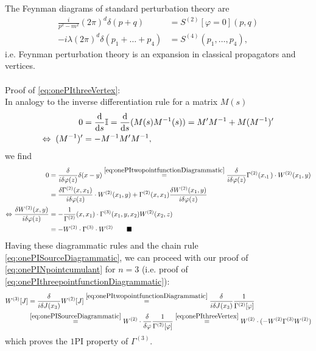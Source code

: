 The Feynman diagrams of standard perturbation theory are
\begin{align}
	\frac{i}{p^2-m^2} (2\pi)^d \delta(p+q) &= S^{(2)}[\varphi=0](p,q) \\
	-i \lambda (2\pi)^d \delta(p_1+\dots+p_4) &=S^{(4)}(p_1,\dots,p_4),
\end{align}
i.e. Feynman perturbation theory is an expansion in classical propagators and vertices.\\
\\
Proof of \ref{eq:onePIthreeVertex}:\\
In analogy to the inverse differentiation rule for a matrix $M(s)$
\begin{align*}
	0&= \frac{\mathrm{d}}{\mathrm{d} s}\mathbb{I} = \frac{\mathrm{d}}{\mathrm{d} s} (M(s) M^{-1}(s)) = M^\prime M^{-1} + M(M^{-1})^\prime \\
	\Leftrightarrow\; (M^{-1})^\prime &= -M^{-1} M^\prime M^{-1},
\end{align*}
we find
\begin{align*}
	0&= \frac{\delta}{i\delta \varphi(z)} \delta(x-y) \stackrel{\ref{eq:onePItwopointfunctionDiagrammatic}}{=} \frac{\delta}{i\delta \varphi(z)} \Gamma^{(2)}(x,_1) \cdot W^{(2)}(x_1,y) \\
	&= \frac{\delta \Gamma^{(2)}(x,x_1)}{i\delta \varphi(z)} \cdot W^{(2)}(x_1,y) + \Gamma^{(2)}(x,x_1) \frac{\delta W^{(2)}(x_1,y)}{i\delta \varphi(z)}\\
	\Leftrightarrow \frac{\delta W^{(2)}(x,y)}{i\delta \varphi(z)} &= -\frac{1}{\Gamma^{(2)}}(x,x_1) \cdot \Gamma^{(3)}(x_1,y,x_2) W^{(2)}(x_2,z) \\
	&= -W^{(2)} \cdot \Gamma^{(3)} \cdot W^{(2)} \qquad \blacksquare
\end{align*}
Having these diagrammatic rules and the chain rule \ref{eq:onePISourceDiagrammatic}, we can proceed with our proof of \ref{eq:onePINpointcumulant} for $n=3$ (i.e. proof of \ref{eq:onePIthreepointfunctionDiagrammatic}):
\begin{align*}
	W^{(3)}[J] &= \frac{\delta}{i \delta J(x_3)} W^{(2)}[J] \stackrel{\ref{eq:onePItwopointfunctionDiagrammatic}}{=} \frac{\delta}{i\delta J(x_3)} \frac{1}{\Gamma^{(2)}[\varphi]} \\
	&\stackrel{\ref{eq:onePISourceDiagrammatic}}{=} W^{(2)} \cdot \frac{\delta}{\delta \varphi} \frac{1}{\Gamma^{(2)}[\varphi]} \stackrel{\ref{eq:onePIthreeVertex}}{=} W^{(2)} \cdot (-W^{(2)} \Gamma^{(3)} W^{(2)})
\end{align*}
which proves the $1$PI property of $\Gamma^{(3)}$.\\

